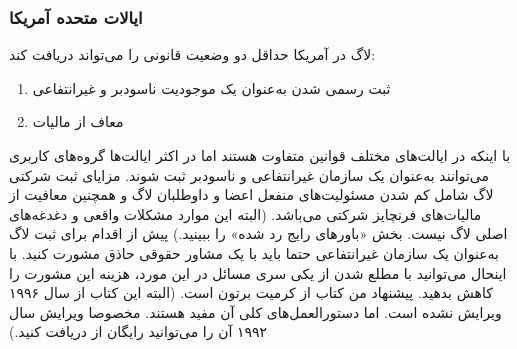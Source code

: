 \subsubsection{ایالات متحده آمریکا}
لاگ در آمریکا حداقل دو وضعیت قانونی را می‌تواند دریافت کند:

\begin{enumerate}
\item
ثبت رسمی شدن به‌عنوان یک موجودیت ناسودبر و غیرانتفاعی
\item
معاف از مالیات
\end{enumerate}

با اینکه در ایالت‌های مختلف قوانین متفاوت هستند اما در اکثر ایالت‌ها
گروه‌های کاربری می‌توانند به‌عنوان یک سازمان غیرانتفاعی و ناسودبر ثبت شوند.
مزایای ثبت شرکتی لاگ شامل کم شدن مسئولیت‌های منفعل اعضا و داوطلبان لاگ
و همچنین معافیت از مالیات‌های فرنچایز شرکتی می‌باشد.
(البته این موارد مشکلات واقعی و دغدغه‌های اصلی لاگ نیست.
بخش «باورهای رایج رد شده» را ببینید.)
پیش از اقدام برای ثبت لاگ به‌عنوان یک سازمان غیرانتفاعی حتما
باید با یک مشاور حقوقی حاذق مشورت کنید. با اینحال می‌توانید با مطلع شدن
از یکی سری مسائل در این مورد، هزینه این مشورت را کاهش بدهید.
پیشنهاد من کتاب
از کرمیت برتون است. (البته این کتاب از سال ۱۹۹۶ ویرایش نشده است.
اما دستورالعمل‌های کلی آن مفید هستند. مخصوصا ویرایش سال ۱۹۹۲ آن
را می‌توانید رایگان از
دریافت کنید.)

